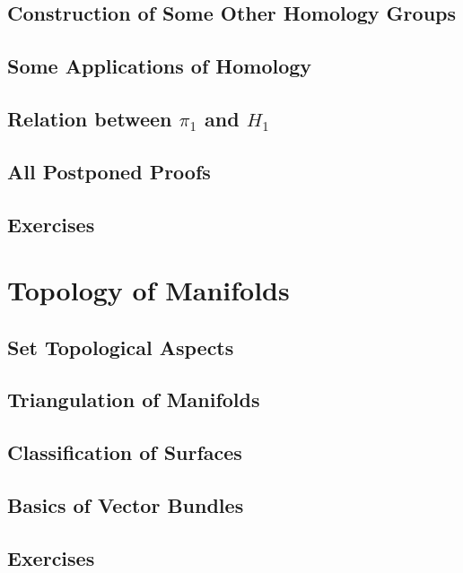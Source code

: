 \subsection{Construction of Some Other Homology Groups}

\subsection{Some Applications of Homology}

\subsection{Relation between $\pi_1$ and $H_1$}  

\subsection{All Postponed Proofs}

\subsection{Exercises}

\section{Topology of Manifolds}

\subsection{Set Topological Aspects}

\subsection{Triangulation of Manifolds}

\subsection{Classification of Surfaces}

\subsection{Basics of Vector Bundles}

\subsection{Exercises}


